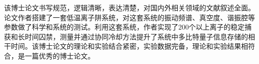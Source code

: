 
\begin{comments}

    该博士论文书写规范，逻辑清晰，表达清楚，对国内外相关领域的文献叙述全面。论文作者搭建了一套低温离子阱系统，对这套系统的振动频谱、真空度、谐振腔等参数做了科学和系统的测试。利用这套系统，作者实现了200个以上离子的稳定捕获和长时间囚禁，测量并通过协同冷却方法提升了系统中多比特量子信息存储的相干时间。该博士论文的理论和实验结合紧密，实验数据完备，理论和实验结果相符合，是一篇优秀的博士论文。
    
\end{comments}
